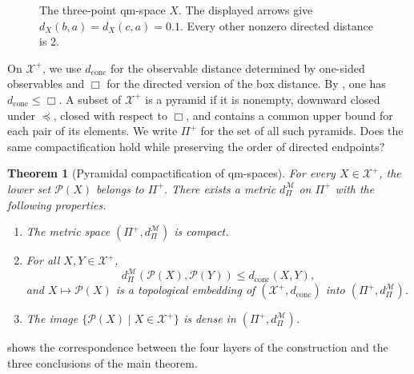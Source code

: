 \documentclass{amsart}
\theoremstyle{plain}
\newtheorem{theorem}{Theorem}[section]
\theoremstyle{definition}
\theoremstyle{remark}
\newcommand{\Xp}{\mathcal{X}^{+}}
\newcommand{\M}{\mathcal{M}}
\newcommand{\dconc}{d_{\operatorname{conc}}}
\begin{document}
\begin{figure}[t]
\centering
{}
\caption{The three-point qm-space $X$. The displayed arrows give $d_X(b,a)=d_X(c,a)=0.1$. Every other nonzero directed distance is $2$.}
\label{fig:three-point-directed-obstruction}
\end{figure}

On $\Xp$, we use $\dconc$ for the observable distance determined by one-sided observables and $\Box$ for the directed version of the box distance. By \cite[Proposition~5.8]{gds1}, one has $\dconc\leq\Box$. A subset of $\Xp$ is a pyramid if it is nonempty, downward closed under $\preceq$, closed with respect to $\Box$, and contains a common upper bound for each pair of its elements. We write $\Pi^+$ for the set of all such pyramids. Does the same compactification hold while preserving the order of directed endpoints?

\begin{theorem}[Pyramidal compactification of qm-spaces]
\label{thm:intro-qm-pyramidal-compactification}
For every $X\in\Xp$, the lower set $\mathcal P(X)$ belongs to $\Pi^+$. There exists a metric $d_{\Pi}^{\M}$ on $\Pi^+$ with the following properties.
\begin{enumerate}[label=\textup{(\roman*)}]
\item The metric space $(\Pi^+,d_{\Pi}^{\M})$ is compact.
\item For all $X,Y\in\Xp$,
\[d_{\Pi}^{\M}(\mathcal P(X),\mathcal P(Y))\leq\dconc(X,Y),\]
and $X\mapsto\mathcal P(X)$ is a topological embedding of $(\Xp,\dconc)$ into $(\Pi^+,d_{\Pi}^{\M})$.
\item The image $\{\mathcal P(X)\mid X\in\Xp\}$ is dense in $(\Pi^+,d_{\Pi}^{\M})$.
\end{enumerate}
\end{theorem}

 shows the correspondence between the four layers of the construction and the three conclusions of the main theorem.
\end{document}
